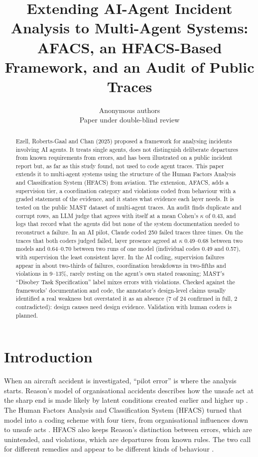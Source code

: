 \documentclass[10pt]{article}
\title{Extending AI-Agent Incident Analysis to Multi-Agent Systems: AFACS, an HFACS-Based Framework, and an Audit of Public Traces}
\author{Anonymous authors\\Paper under double-blind review}
\begin{document}
\maketitle

\begin{abstract}
\noindent
Ezell, Roberts-Gaal and Chan (2025) proposed a framework for analysing incidents
involving AI agents. It treats single agents, does not distinguish deliberate
departures from known requirements from errors, and has been illustrated on a
public incident report but, as far as this study found, not used to code agent
traces.
This paper extends it to multi-agent systems using the structure of the Human
Factors Analysis and Classification System (HFACS) from aviation. The extension,
AFACS, adds a supervision tier, a coordination category and violations coded from
behaviour with a graded statement of the evidence, and it states what evidence
each layer needs. It is tested on the public MAST dataset of multi-agent traces.
An audit finds duplicate and corrupt rows, an LLM judge that agrees with itself at
a mean Cohen's $\kappa$ of 0.43, and logs that record what the agents did but
none of the system documentation needed to reconstruct a failure. In an AI pilot, Claude coded 250 failed traces three times. On the traces that both coders judged failed, layer presence agreed at $\kappa$ 0.49--0.68 between two models and 0.64--0.70 between two runs of one model (individual codes 0.49 and 0.57), with supervision the least consistent layer. In the AI coding, supervision failures appear in about two-thirds of failures, coordination breakdowns in two-fifths and violations in
9--13\%, rarely resting on the agent's own stated reasoning; MAST's ``Disobey Task
Specification'' label mixes errors with violations. Checked against the
frameworks' documentation and code, the annotator's design-level claims usually
identified a real weakness but overstated it as an absence (7 of 24 confirmed in
full, 2 contradicted): design causes need design evidence. Validation with human
coders is planned.
\end{abstract}

\section{Introduction}

When an aircraft accident is investigated, ``pilot error'' is where the analysis
starts. Reason's model of organisational accidents describes how the unsafe act
at the sharp end is made likely by latent conditions created earlier and higher
up \citep{reason1990human,reason1997managing}. The Human Factors Analysis and
Classification System (HFACS) turned that model into a coding scheme with four
tiers, from organisational influences down to unsafe
acts \citep{shappell2000hfacs,wiegmann2003human}. HFACS also keeps Reason's
distinction between errors, which are unintended, and violations, which are
departures from known rules. The two call for different remedies and appear to be
different kinds of behaviour \citep{reason1990errors}.
\end{document}
